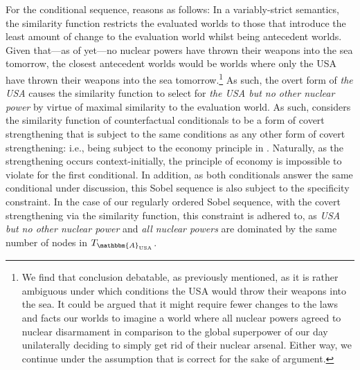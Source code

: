 For the conditional sequence, \textcite[p. 651]{Ippolito2020} reasons as follows: In a variably-strict semantics, the similarity function restricts the evaluated worlds to those that introduce the least amount of change to the evaluation world whilst being antecedent worlds. Given that---as of yet---no nuclear powers have thrown their weapons into the sea tomorrow, the closest antecedent worlds would be worlds where only the USA have thrown their weapons into the sea tomorrow.\footnote{We find that conclusion debatable, as previously mentioned, as it is rather ambiguous under which conditions the USA would throw their weapons into the sea. It could be argued that it might require fewer changes to the laws and facts our worlds to imagine a world where all nuclear powers agreed to nuclear disarmament in comparison to the global superpower of our day unilaterally deciding to simply get rid of their nuclear arsenal. Either way, we continue under the assumption that \textcite{Ippolito2020} is correct for the sake of argument.} As such, the overt form of \textit{the USA} causes the similarity function to select for \textit{the USA but no other nuclear power} by virtue of maximal similarity to the evaluation world. As such, \textcite{Ippolito2020} considers the similarity function of counterfactual conditionals to be a form of covert strengthening that is subject to the same conditions as any other form of covert strengthening: i.e., being subject to the economy principle in . Naturally, as the strengthening occurs context-initially, the principle of economy is impossible to violate for the first conditional. In addition, as both conditionals answer the same conditional under discussion, this Sobel sequence is also subject to the specificity constraint. In the case of our regularly ordered Sobel sequence, with the covert strengthening via the similarity function, this constraint is adhered to, as \textit{USA but no other nuclear power} and \textit{all nuclear powers} are dominated by the same number of nodes in $T_{\mathbbm{A}_\text{USA}}$.

